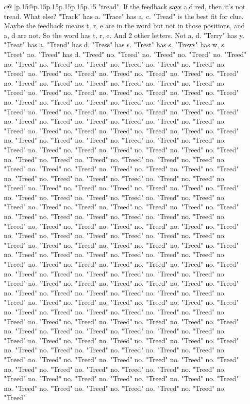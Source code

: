 \documentclass{article}
\begin{document}
{\begin{supertabular}{c@{$\;$}|p{.15\linewidth}@{}p{.15\linewidth}p{.15\linewidth}p{.15\linewidth}p{.15\linewidth}p{.15\linewidth}}
{{{"tread". If the feedback says a,d red, then it's not tread. What else? "Track" has a. "Trace" has a, c. "Tread" is the best fit for clue. Maybe the feedback means t, r, e are in the word but not in those positions, and a, d are not. So the word has t, r, e. And 2 other letters. Not a, d. "Terry" has y. "Treat" has a. "Trend" has d. "Tress" has s. "Trest" has s. "Trews" has w, s. "Treet" no. "Treed" has d. "Treed" no. "Treed" no. "Treed" no. "Treed" no. "Treed" no. "Treed" no. "Treed" no. "Treed" no. "Treed" no. "Treed" no. "Treed" no. "Treed" no. "Treed" no. "Treed" no. "Treed" no. "Treed" no. "Treed" no. "Treed" no. "Treed" no. "Treed" no. "Treed" no. "Treed" no. "Treed" no. "Treed" no. "Treed" no. "Treed" no. "Treed" no. "Treed" no. "Treed" no. "Treed" no. "Treed" no. "Treed" no. "Treed" no. "Treed" no. "Treed" no. "Treed" no. "Treed" no. "Treed" no. "Treed" no. "Treed" no. "Treed" no. "Treed" no. "Treed" no. "Treed" no. "Treed" no. "Treed" no. "Treed" no. "Treed" no. "Treed" no. "Treed" no. "Treed" no. "Treed" no. "Treed" no. "Treed" no. "Treed" no. "Treed" no. "Treed" no. "Treed" no. "Treed" no. "Treed" no. "Treed" no. "Treed" no. "Treed" no. "Treed" no. "Treed" no. "Treed" no. "Treed" no. "Treed" no. "Treed" no. "Treed" no. "Treed" no. "Treed" no. "Treed" no. "Treed" no. "Treed" no. "Treed" no. "Treed" no. "Treed" no. "Treed" no. "Treed" no. "Treed" no. "Treed" no. "Treed" no. "Treed" no. "Treed" no. "Treed" no. "Treed" no. "Treed" no. "Treed" no. "Treed" no. "Treed" no. "Treed" no. "Treed" no. "Treed" no. "Treed" no. "Treed" no. "Treed" no. "Treed" no. "Treed" no. "Treed" no. "Treed" no. "Treed" no. "Treed" no. "Treed" no. "Treed" no. "Treed" no. "Treed" no. "Treed" no. "Treed" no. "Treed" no. "Treed" no. "Treed" no. "Treed" no. "Treed" no. "Treed" no. "Treed" no. "Treed" no. "Treed" no. "Treed" no. "Treed" no. "Treed" no. "Treed" no. "Treed" no. "Treed" no. "Treed" no. "Treed" no. "Treed" no. "Treed" no. "Treed" no. "Treed" no. "Treed" no. "Treed" no. "Treed" no. "Treed" no. "Treed" no. "Treed" no. "Treed" no. "Treed" no. "Treed" no. "Treed" no. "Treed" no. "Treed" no. "Treed" no. "Treed" no. "Treed" no. "Treed" no. "Treed" no. "Treed" no. "Treed" no. "Treed" no. "Treed" no. "Treed" no. "Treed" no. "Treed" no. "Treed" no. "Treed" no. "Treed" no. "Treed" no. "Treed" no. "Treed" no. "Treed" no. "Treed" no. "Treed" no. "Treed" no. "Treed" no. "Treed" no. "Treed" no. "Treed" no. "Treed" no. "Treed" no. "Treed" no. "Treed" no. "Treed" no. "Treed" no. "Treed" no. "Treed" no. "Treed" no. "Treed" no. "Treed" no. "Treed" no. "Treed" no. "Treed" no. "Treed" no. "Treed" no. "Treed" no. "Treed" no. "Treed" no. "Treed" no. "Treed" no. "Treed" no. "Treed" no. "Treed" no. "Treed" no. "Treed" no. "Treed" no. "Treed" no. "Treed" no. "Treed" no. "Treed" no. "Treed" no. "Treed" no. "Treed" no. "Treed" no. "Treed" no. "Treed" no. "Treed" no. "Treed" no. "Treed" no. "Treed" no. "Treed" no. "Treed" no. "Treed" no. "Treed" no. "Treed" no. "Treed" no. "Treed" no. "Treed" no. "Treed" no. "Treed" no. "Treed" no. "Treed" no. "Treed" no. "Treed" no. "Treed" no. "Treed" no. "Treed" no. "Treed" no. "Treed" no. "Treed" no. "Treed" no. "Treed" no. "Treed" no. "Treed" }}}
\end{supertabular}}
\end{document}
